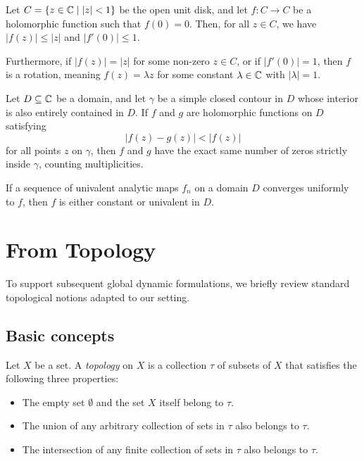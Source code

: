 \begin{lemma*}
    Let $C = \{ z \in \mathbb{C} \mid |z| < 1 \}$ be the open unit disk, and let
    $f: C \to C$ be a holomorphic function such that $f(0) = 0$. Then, for all
    $z \in C$, we have $|f(z)| \leq |z|$ and $|f'(0)| \leq 1$.

    Furthermore, if $|f(z)| = |z|$ for some non-zero $z \in C$, or if
    $|f'(0)| = 1$, then $f$ is a rotation, meaning $f(z) = \lambda z$ for some
    constant $\lambda \in \mathbb{C}$ with $|\lambda| = 1$.
\end{lemma*}

\begin{theorem*}
    Let $D \subseteq \mathbb{C}$ be a domain, and let $\gamma$ be a simple closed contour
    in $D$ whose interior is also entirely contained in $D$. If $f$ and $g$ are
    holomorphic functions on $D$ satisfying
    \[ |f(z) - g(z)| < |f(z)| \]
    for all points $z$ on $\gamma$, then $f$ and $g$ have the exact same number
    of zeros strictly inside $\gamma$, counting multiplicities.
\end{theorem*}

\begin{theorem*}
    If a sequence of univalent analytic maps $f_n$ on a domain $D$ converges
    uniformly to $f$, then $f$ is either constant or univalent in $D$.
\end{theorem*}

\section*{From Topology}

To support subsequent global dynamic formulations, we briefly review standard
topological notions adapted to our setting.

\subsection*{Basic concepts}

\begin{definition*}[Topology]
    Let $X$ be a set. A \emph{topology} on $X$ is a collection $\tau$ of subsets
    of $X$ that satisfies the following three properties:
    \begin{itemize}
        \item The empty set $\emptyset$ and the set $X$ itself belong to $\tau$.
        \item The union of any arbitrary collection of sets in $\tau$ also
        belongs to $\tau$.
        \item The intersection of any finite collection of sets in $\tau$ also
        belongs to $\tau$.
    \end{itemize}
\end{definition*}

